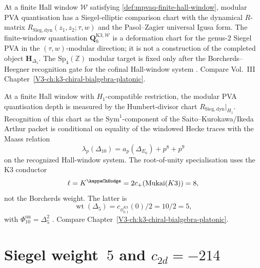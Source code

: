 \begin{remark}
\label{rem:mpvaq-1}
At a finite Hall window $\mathcal W$ satisfying
\cref{def:mpvaq-finite-hall-window}, modular PVA quantisation has a
Siegel-elliptic comparison chart with the dynamical $R$-matrix
$R_{\mathrm{Sieg,dyn}}(z_1, z_2;\tau, w)$ and the Pasol--Zagier
universal Igusa form.  The finite-window quantisation
$\mathbf Q_{\hbar}^{\mathrm{K3},\mathcal W}$ is a deformation chart for
the genus-$2$ Siegel PVA in the $(\tau,w)$-modular direction; it is not a
construction of the completed object $\mathbf H_{\Delta_5}$.  The
$\mathrm{Sp}_4(\mathbb Z)$ modular target is fixed only after the
Borcherds--Heegner recognition gate for the cofinal Hall-window system
\cite{PasolZagier2013,Felder1995}. Compare Vol.~III
Chapter~\ref{V3-ch:k3-chiral-bialgebra-platonic}.
\end{remark}

\begin{remark}
\label{rem:mpvaq-2}
At a finite Hall window with $H_1$-compatible restriction, the modular
PVA quantisation depth is measured by the Humbert-divisor chart
$R_{\mathrm{Sieg,dyn}}|_{H_1}$.  Recognition of this chart as the
$\mathrm{Sym}^1$-component of the Saito--Kurokawa/Ikeda Arthur packet is
conditional on equality of the windowed Hecke traces with the Maass
relation
\[
\lambda_p(\Delta_{10}) = a_p(\Delta_{E_6}) + p^8 + p^9
\]
on the recognized Hall-window system.  The root-of-unity specialisation
uses the K3 conductor
\[
 \ell = K^{\kappaChHodge}
 =2c_+(\mathrm{Mukai}(K3))=8,
\]
not the Borcherds weight. The latter is
\[
 \operatorname{wt}(\Delta_5)
 =c_{\phi_{0,1}^{K3}}(0)/2=10/2=5,
\]
with $\Phi_{10}^{\mathrm{un}}=\Delta_5^2$
\cite{Andrianov1974,Ikeda2001,Lusztig1990}. Compare
Chapter~\ref{V3-ch:k3-chiral-bialgebra-platonic}.
\end{remark}

\section{Siegel weight~$5$ and $c_{2d} = -214$}
\label{sec:mpvaq-supplement-ii}

